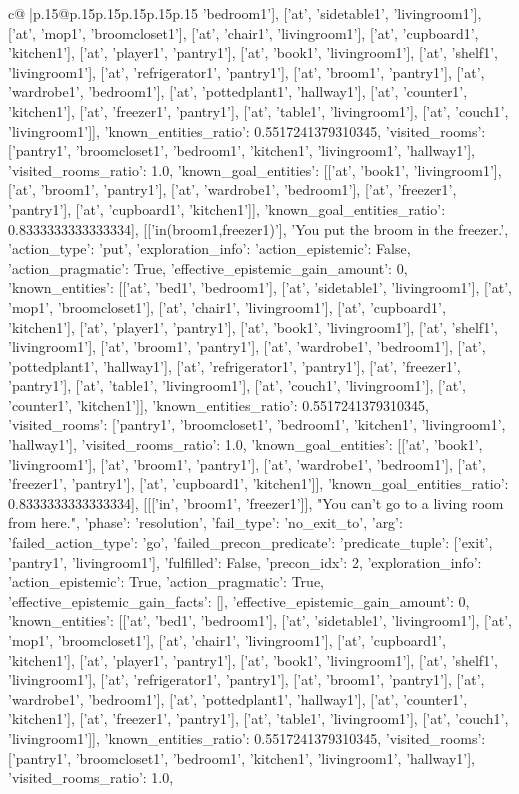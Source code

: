 \documentclass{article}
\begin{document}
{\begin{supertabular}{c@{$\;$}|p{.15\linewidth}@{}p{.15\linewidth}p{.15\linewidth}p{.15\linewidth}p{.15\linewidth}p{.15\linewidth}}
{{{'bedroom1'], ['at', 'sidetable1', 'livingroom1'], ['at', 'mop1', 'broomcloset1'], ['at', 'chair1', 'livingroom1'], ['at', 'cupboard1', 'kitchen1'], ['at', 'player1', 'pantry1'], ['at', 'book1', 'livingroom1'], ['at', 'shelf1', 'livingroom1'], ['at', 'refrigerator1', 'pantry1'], ['at', 'broom1', 'pantry1'], ['at', 'wardrobe1', 'bedroom1'], ['at', 'pottedplant1', 'hallway1'], ['at', 'counter1', 'kitchen1'], ['at', 'freezer1', 'pantry1'], ['at', 'table1', 'livingroom1'], ['at', 'couch1', 'livingroom1']], 'known_entities_ratio': 0.5517241379310345, 'visited_rooms': ['pantry1', 'broomcloset1', 'bedroom1', 'kitchen1', 'livingroom1', 'hallway1'], 'visited_rooms_ratio': 1.0, 'known_goal_entities': [['at', 'book1', 'livingroom1'], ['at', 'broom1', 'pantry1'], ['at', 'wardrobe1', 'bedroom1'], ['at', 'freezer1', 'pantry1'], ['at', 'cupboard1', 'kitchen1']], 'known_goal_entities_ratio': 0.8333333333333334}}], [['in(broom1,freezer1)'], 'You put the broom in the freezer.', {'action_type': 'put', 'exploration_info': {'action_epistemic': False, 'action_pragmatic': True, 'effective_epistemic_gain_amount': 0, 'known_entities': [['at', 'bed1', 'bedroom1'], ['at', 'sidetable1', 'livingroom1'], ['at', 'mop1', 'broomcloset1'], ['at', 'chair1', 'livingroom1'], ['at', 'cupboard1', 'kitchen1'], ['at', 'player1', 'pantry1'], ['at', 'book1', 'livingroom1'], ['at', 'shelf1', 'livingroom1'], ['at', 'broom1', 'pantry1'], ['at', 'wardrobe1', 'bedroom1'], ['at', 'pottedplant1', 'hallway1'], ['at', 'refrigerator1', 'pantry1'], ['at', 'freezer1', 'pantry1'], ['at', 'table1', 'livingroom1'], ['at', 'couch1', 'livingroom1'], ['at', 'counter1', 'kitchen1']], 'known_entities_ratio': 0.5517241379310345, 'visited_rooms': ['pantry1', 'broomcloset1', 'bedroom1', 'kitchen1', 'livingroom1', 'hallway1'], 'visited_rooms_ratio': 1.0, 'known_goal_entities': [['at', 'book1', 'livingroom1'], ['at', 'broom1', 'pantry1'], ['at', 'wardrobe1', 'bedroom1'], ['at', 'freezer1', 'pantry1'], ['at', 'cupboard1', 'kitchen1']], 'known_goal_entities_ratio': 0.8333333333333334}}], [[['in', 'broom1', 'freezer1']], "You can't go to a living room from here.", {'phase': 'resolution', 'fail_type': 'no_exit_to', 'arg': {'failed_action_type': 'go', 'failed_precon_predicate': {'predicate_tuple': ['exit', 'pantry1', 'livingroom1'], 'fulfilled': False, 'precon_idx': 2}}, 'exploration_info': {'action_epistemic': True, 'action_pragmatic': True, 'effective_epistemic_gain_facts': [], 'effective_epistemic_gain_amount': 0, 'known_entities': [['at', 'bed1', 'bedroom1'], ['at', 'sidetable1', 'livingroom1'], ['at', 'mop1', 'broomcloset1'], ['at', 'chair1', 'livingroom1'], ['at', 'cupboard1', 'kitchen1'], ['at', 'player1', 'pantry1'], ['at', 'book1', 'livingroom1'], ['at', 'shelf1', 'livingroom1'], ['at', 'refrigerator1', 'pantry1'], ['at', 'broom1', 'pantry1'], ['at', 'wardrobe1', 'bedroom1'], ['at', 'pottedplant1', 'hallway1'], ['at', 'counter1', 'kitchen1'], ['at', 'freezer1', 'pantry1'], ['at', 'table1', 'livingroom1'], ['at', 'couch1', 'livingroom1']], 'known_entities_ratio': 0.5517241379310345, 'visited_rooms': ['pantry1', 'broomcloset1', 'bedroom1', 'kitchen1', 'livingroom1', 'hallway1'], 'visited_rooms_ratio': 1.0, }}}
\end{supertabular}}
\end{document}
